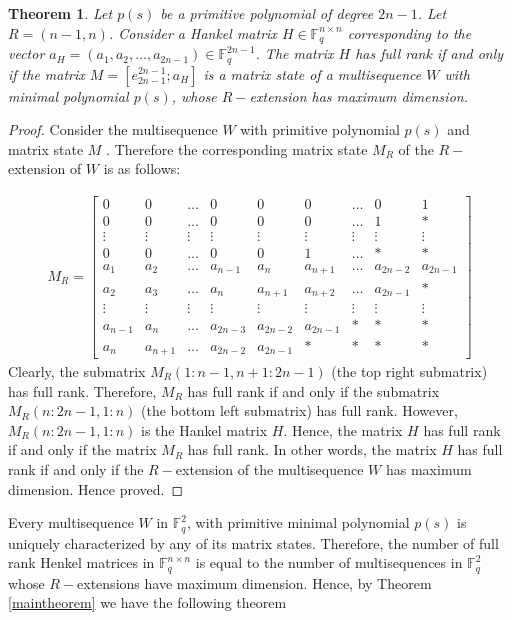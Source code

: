 \documentclass[letterpaper, 12 pt]{article}  \usepackage{amssymb}
\newtheorem{theorem}{Theorem}[section]
\newcommand{\F}{\mathbb{F}}
\begin{document}
\begin{theorem}
Let $p(s)$ be a primitive polynomial of degree $2n-1$. Let $R = (n-1,n)$.
Consider a Hankel matrix $H\in \F_q^{n \times n}$ corresponding to the vector $
a_H = (a_1,a_2,\ldots,a_{2n-1}) \in \F_q^{2n-1}$. The matrix $H$ has full rank
if and only if the matrix $M = [e_{2n-1}^{2n-1}; a_H]$ is a matrix state of a
multisequence $W$ with minimal polynomial $p(s)$, whose $R-$extension has
maximum dimension. 
\end{theorem}
\begin{proof}
Consider the multisequence $W$ with primitive polynomial $p(s)$ and matrix state
$M$ . Therefore the corresponding matrix state $M_R$ of the $R-$extension of $W$
is as follows:

\begin{eqnarray*}
 M_R= \left[
 \begin{array}{ccccc|cccc}
0 & 0 &\ldots&  0 & 0 & 0 &\ldots& 0 & 1\\
0 & 0 &\ldots&  0 & 0 & 0 &\ldots &1 & *\\
\vdots &\vdots  & \vdots & \vdots & \vdots & \vdots & \vdots & \vdots
& \vdots \\
0 & 0 &\ldots&  0 & 0 & 1 &\ldots& * & *\\
\hline
a_1 & a_2 & \ldots & a_{n-1} & a_{n}  & a_{n+1} & \ldots & a_{2n-2}
& a_{2n-1}\\ 
a_2 & a_3 & \ldots & a_{n} & a_{n+1}  & a_{n+2} & \ldots & a_{2n-1}
& *\\ 
\vdots &\vdots & \vdots &  \vdots & \vdots & \vdots & \vdots & \vdots
& \vdots \\ 
a_{n-1} & a_{n} &\ldots &  a_{2n-3} & a_{2n-2} & a_{2n-1} & * & * & *
\\
a_n & a_{n+1} &\ldots &  a_{2n-2} & a_{2n-1} & * & * & * & * 
\end{array}\right]
\end{eqnarray*}
Clearly, the submatrix $M_R(1:n-1,n+1 : 2n-1)$ (the top right
submatrix) has full rank. Therefore, $M_R$ has full rank if and only if the
submatrix $M_R(n:2n-1,1 : n)$ (the bottom left submatrix) has full rank.
However, $M_R(n:2n-1,1 : n)$ is the Hankel matrix $H$. Hence, the matrix $H$
has full rank if and only if the matrix $M_R$ has full rank. In other words, the
matrix $H$ has full rank if and only if the $R-$extension  of the multisequence
$W$ has maximum dimension. Hence proved.
\end{proof}

Every multisequence $W$ in $\F_q^2$, with primitive minimal polynomial $p(s)$
is uniquely characterized by any of its matrix states. Therefore, the number of
full rank Henkel matrices in $\F_q^{n \times n}$
is equal to the number of multisequences in $\F_q^2$ whose $R-$extensions have
maximum dimension. Hence, by Theorem \ref{maintheorem} we have the following
theorem
\end{document}
